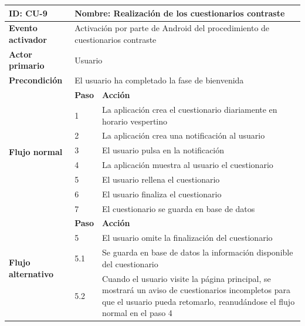             \begin{table}[h]
                \centering
                \begin{tabularx}{\textwidth}{|l|l|X|}
                    \hline
                    \textbf{ID:} CU-9 & \multicolumn{2}{|X|}{\textbf{Nombre}: Realización de los cuestionarios contraste} \\
                    \hline
                    \textbf{Evento activador} & \multicolumn{2}{|X|}{Activación por parte de Android del procedimiento de cuestionarios contraste} \\
                    \hline
                    \textbf{Actor primario} & \multicolumn{2}{|X|}{Usuario} \\
                    \hline
                    \textbf{Precondición} & \multicolumn{2}{|X|}{El usuario ha completado la fase de bienvenida} \\
                    \hline
                    \multirow{8}{*}{\textbf{Flujo normal}} & \textbf{Paso} & \textbf{Acción} \\
                    \cline{2-3} & 1 & La aplicación crea el cuestionario diariamente en horario vespertino \\
                    \cline{2-3} & 2 & La aplicación crea una notificación al usuario \\
                    \cline{2-3} & 3 & El usuario pulsa en la notificación \\
                    \cline{2-3} & 4 & La aplicación muestra al usuario el cuestionario \\
                    \cline{2-3} & 5 & El usuario rellena el cuestionario \\
                    \cline{2-3} & 6 & El usuario finaliza el cuestionario \\
                    \cline{2-3} & 7 & El cuestionario se guarda en base de datos \\
                    \hline
                    \multirow{6}{*}{\textbf{Flujo alternativo}} & \textbf{Paso} & \textbf{Acción} \\
                    \cline{2-3} & 5 & El usuario omite la finalización del cuestionario \\
                    \cline{2-3} & 5.1 & Se guarda en base de datos la información disponible del cuestionario \\
                    \cline{2-3} & 5.2 & Cuando el usuario visite la página principal, se mostrará un aviso de cuestionarios incompletos para que el usuario pueda retomarlo, reanudándose el flujo normal en el paso 4 \\

\end{tabularx}
\end{table}
